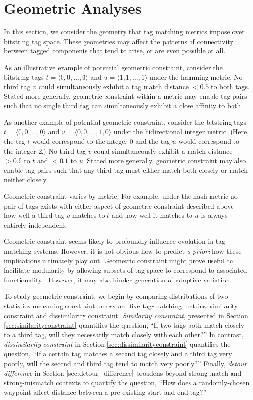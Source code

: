 \section{Geometric Analyses} \label{sec:geometric}

In this section, we consider the geometry that tag matching metrics impose over bitstring tag space.
These geometries may affect the patterns of connectivity between tagged components that tend to arise, or are even possible at all.

As an illustrative example of potential geometric constraint, consider the bitstring tags $t = \langle 0, 0, \ldots, 0 \rangle$ and $u = \langle 1, 1, \ldots, 1 \rangle$ under the hamming metric.
No third tag $v$ could simultaneously exhibit a tag match distance $<0.5$ to both tags.
Stated more generally, geometric constraint within a metric may enable tag pairs such that no single third tag can simultaneously exhibit a close affinity to both.

As another example of potential geometric constraint, consider the bitstring tags $t = \langle 0, 0, \ldots, 0 \rangle$ and $u = \langle 0, 0, \ldots, 1 , 0 \rangle$ under the bidirectional integer metric.
(Here, the tag $t$ would correspond to the integer 0 and the tag $u$ would correspond to the integer 2.)
No third tag $v$ could simultaneously exhibit a match distance $>0.9$ to $t$ and $<0.1$ to $u$.
Stated more generally, geometric constraint may also enable tag pairs such that any third tag must either match both closely or match neither closely.

Geometric constraint varies by metric.
For example, under the hash metric no pair of tags exists with either aspect of geometric constraint described above --- how well a third tag $v$ matches to $t$ and how well it matches to $u$ is always entirely independent.

Geometric constraint seems likely to profoundly influence evolution in tag-matching systems.
However, it is not obvious how to predict \textit{a priori} how these implications ultimately play out.
Geometric constraint might prove useful to facilitate modularity by allowing subsets of tag space to correspond to associated functionality \citep{holland1990concerning}.
However, it may also hinder generation of adaptive variation.

To study geometric constraint, we begin by comparing distributions of two statistics measuring constraint across our five tag-matching metrics: similarity constraint and dissimilarity constraint.
\textit{Similarity constraint}, presented in Section \ref{sec:similarityconstraint} quantifies the question, ``If two tags both match closely to a third tag, will they necessarily match closely with each other?''
In contrast, \textit{dissimilarity constraint} in Section \ref{sec:dissimilarityconstraint} quantifies the question, ``If a certain tag matches a second tag closely and a third tag very poorly, will the second and third tag tend to match very poorly?''
Finally, \textit{detour difference} in Section \ref{sec:detour_difference} broadens beyond strong-match and strong-mismatch contexts to quantify the question, ``How does a randomly-chosen waypoint affect distance between a pre-existing start and end tag?''

